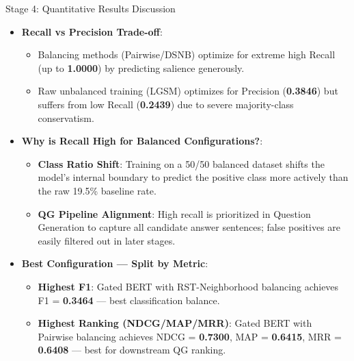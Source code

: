 \documentclass[aspectratio=169]{beamer}
\begin{document}
\begin{frame}{Stage 4: Quantitative Results Discussion}
    \begin{itemize}
        \item \textbf{Recall vs Precision Trade-off}:
            \begin{itemize}
                \item Balancing methods (Pairwise/DSNB) optimize for extreme high Recall (up to \textbf{1.0000}) by predicting salience generously.
                \item Raw unbalanced training (LGSM) optimizes for Precision (\textbf{0.3846}) but suffers from low Recall (\textbf{0.2439}) due to severe majority-class conservatism.
            \end{itemize}
        \vspace{0.15cm}
        \item \textbf{Why is Recall High for Balanced Configurations?}:
            \begin{itemize}
                \item \textbf{Class Ratio Shift}: Training on a 50/50 balanced dataset shifts the model's internal boundary to predict the positive class more actively than the raw 19.5\% baseline rate.
                \item \textbf{QG Pipeline Alignment}: High recall is prioritized in Question Generation to capture all candidate answer sentences; false positives are easily filtered out in later stages.
            \end{itemize}
        \vspace{0.15cm}
        \item \textbf{Best Configuration --- Split by Metric}:
            \begin{itemize}
                \item \textbf{Highest F1}: Gated BERT with RST-Neighborhood balancing achieves F1 = \textbf{0.3464} --- best classification balance.
                \item \textbf{Highest Ranking (NDCG/MAP/MRR)}: Gated BERT with Pairwise balancing achieves NDCG = \textbf{0.7300}, MAP = \textbf{0.6415}, MRR = \textbf{0.6408} --- best for downstream QG ranking.
            \end{itemize}
    \end{itemize}
\end{frame}
\end{document}
